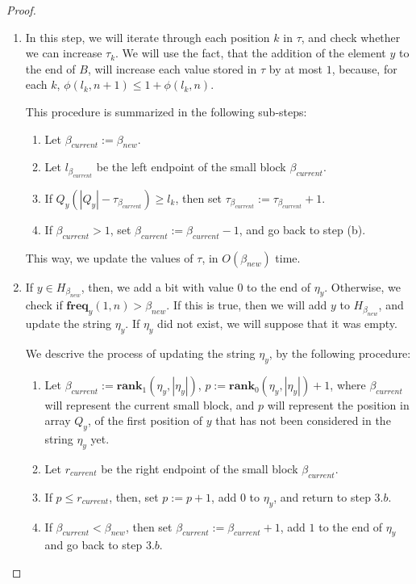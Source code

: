 \documentclass[runningheads]{llncs}
\begin{document}
\begin{proof}
\begin{enumerate}
        \item In this step, we will iterate through each position $k$ in $\tau$, and check whether we can increase $\tau_k$. 
                We will use the fact, that the addition of the element $y$ to the end of $B$, will increase each value stored in $\tau$ by at most $1$, because, 
                for each $k$, $\phi(l_k, n+1)\leq 1+\phi(l_k, n)$.

                This procedure is summarized in the following sub-steps:
                
                \begin{enumerate}
                    \item Let $\beta_{current}:=\beta_{new}$. 
                    \item Let $l_{\beta_{current}}$ be the left endpoint of the small block $\beta_{current}$.
                    \item If $Q_{y}( |Q_{y}|-\tau_{\beta_{current}} )\geq l_k$, then set $\tau_{\beta_{current}}:=\tau_{\beta_{current}}+1$.
                    \item If $\beta_{current}>1$, set $\beta_{current}:=\beta_{current}-1$, and go back to step (b).

                \end{enumerate}

                This way, we update the values of $\tau$, in $O(\beta_{new})$ time.
        
        \item If $y\in H_{\beta_{new}}$, then, we add a bit with value $0$ to the end of $\eta_{y}$. 
        Otherwise, we check if $ \textbf{freq}_{y}(1, n)>\beta_{new} $. If this is true, then we will add $y$ to $H_{\beta_{new}}$, and update the string $\eta_{y}$. If $\eta_{y}$ did not exist, we will suppose that it was empty.
        
        We descrive the process of updating the string $\eta_{y}$, by the following procedure:
                \begin{enumerate}
                    \item Let $\beta_{current}:=\textbf{rank}_{1}(\eta_{y}, |\eta_{y}|)$, 
                    $p:=\textbf{rank}_{0}(\eta_{y}, |\eta_{y}|)+1$, where $\beta_{current}$ will represent the current small block, 
                    and $p$ will represent the position in array $Q_y$, of the first position of $y$ that has not been considered in the string $\eta_{y}$ yet.
                    \item Let $r_{current}$ be the right endpoint of the small block $\beta_{current}$.
                    \item If $p\leq r_{current}$, then, set $p:=p+1$, add $0$ to $\eta_{y}$, and return to step $3.b$.
                    \item If $\beta_{current}<\beta_{new}$, then set $\beta_{current}:=\beta_{current}+1$, add $1$ to the end of $\eta_{y}$ and go back to step $3.b$.
                \end{enumerate}
        

\end{enumerate}
\end{proof}
\end{document}
